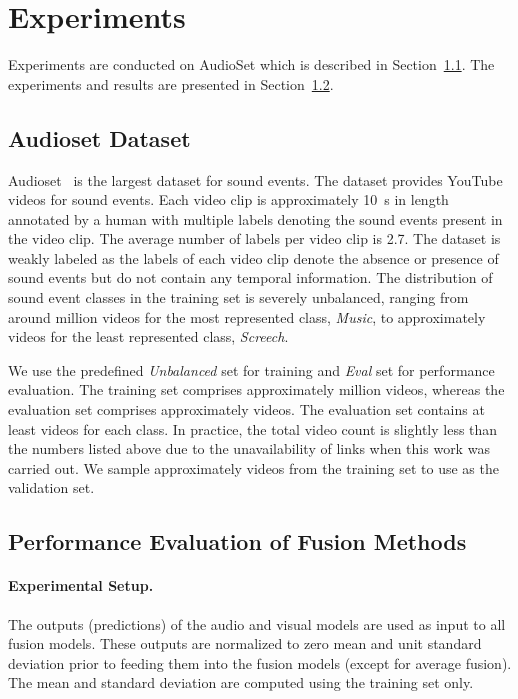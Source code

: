 \documentclass{article}
\begin{document}
\section{Experiments}\label{sec:experiments}

Experiments are conducted on AudioSet which is described in Section~\ref{ssec:dataset}.
The experiments and results are presented in Section~\ref{ssec:baseline}.

\subsection{Audioset Dataset}\label{ssec:dataset}

Audioset~\cite{Gemmeke2017} is the largest dataset for sound events.
The dataset provides YouTube videos for  sound events.
Each video clip is approximately \SI{10}{s} in length annotated by a human with multiple labels denoting the sound events present in the video clip.
The average number of labels per video clip is 2.7.
The dataset is weakly labeled as the labels of each video clip denote the absence or presence of sound events but do not contain any temporal information.
The distribution of sound event classes in the training set is severely unbalanced, ranging from around  million videos for the most represented class, \emph{Music}, to approximately  videos for the least represented class, \emph{Screech}.

We use the predefined {\em Unbalanced} set for training and {\em Eval} set for performance evaluation.
The training set comprises approximately  million videos, whereas the evaluation set comprises approximately  videos.
The evaluation set contains at least  videos for each class.
In practice, the total video count is slightly less than the numbers listed above due to the unavailability of links when this work was carried out.
We sample approximately  videos from the training set to use as the validation set.

\subsection{Performance Evaluation of Fusion Methods}\label{ssec:baseline}

\paragraph{Experimental Setup.}
The outputs (predictions) of the audio and visual models are used as input to all fusion models.
These outputs are normalized to zero mean and unit standard deviation prior to feeding them into the fusion models (except for average fusion).
The mean and standard deviation are computed using the training set only.
\end{document}
